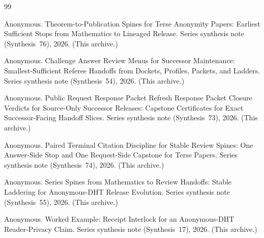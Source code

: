 \documentclass[11pt]{article}
\begin{document}
\begin{thebibliography}{99}\small

Anonymous.
\newblock Theorem-to-Publication Spines for Terse Anonymity Papers: Earliest Sufficient Stops from Mathematics to Lineaged Release.
\newblock Series synthesis note (Synthesis~76), 2026. (This archive.)

Anonymous.
\newblock Challenge Answer Review Menus for Successor Maintenance: Smallest-Sufficient Referee Handoffs from Dockets, Profiles, Packets, and Ladders.
\newblock Series synthesis note (Synthesis~54), 2026. (This archive.)

Anonymous.
\newblock Public Request Response Packet Refresh Response Packet Closure Verdicts for Source-Only Successor Releases: Capstone Certificates for Exact Successor-Facing Handoff Slices.
\newblock Series synthesis note (Synthesis~73), 2026. (This archive.)

Anonymous.
\newblock Paired Terminal Citation Discipline for Stable Review Spines: One Answer-Side Stop and One Request-Side Capstone for Terse Papers.
\newblock Series synthesis note (Synthesis~74), 2026. (This archive.)

Anonymous.
\newblock Series Spines from Mathematics to Review Handoffs: Stable Laddering for Anonymous-DHT Release Evolution.
\newblock Series synthesis note (Synthesis~55), 2026. (This archive.)

Anonymous.
\newblock Worked Example: Receipt Interlock for an Anonymous-DHT Reader-Privacy Claim.
\newblock Series synthesis note (Synthesis~17), 2026. (This archive.)

\end{thebibliography}
\end{document}
